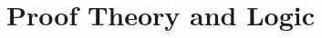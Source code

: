 \documentclass[english,svgnames,hide notes,12pt]{beamer}
\theoremstyle{definition}
\theoremstyle{remark}
\begin{document}



\section{Proof Theory and Logic}
\end{document}
